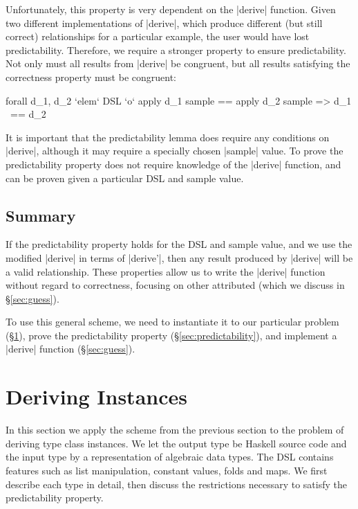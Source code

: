 \documentclass[preprint,draft]{sigplanconf}
\begin{document}
Unfortunately, this property is very dependent on the |derive| function. Given two different implementations of |derive|, which produce different (but still correct) relationships for a particular example, the user would have lost predictability. Therefore, we require a stronger property to ensure predictability. Not only must all results from |derive| be congruent, but all results satisfying the correctness property must be congruent:

\ignore\begin{code}
forall d_1, d_2 `elem` DSL `o`
    apply d_1 sample == apply d_2 sample => d_1 ~== d_2
\end{code}

It is important that the predictability lemma does require any conditions on |derive|, although it may require a specially chosen |sample| value. To prove the predictability property does not require knowledge of the |derive| function, and can be proven given a particular DSL and sample value.

\subsection{Summary}

If the predictability property holds for the DSL and sample value, and we use the modified |derive| in terms of |derive'|, then any result produced by |derive| will be a valid relationship. These properties allow us to write the |derive| function without regard to correctness, focusing on other attributed (which we discuss in \S\ref{sec:guess}).

To use this general scheme, we need to instantiate it to our particular problem (\S\ref{sec:instances}), prove the predictability property (\S\ref{sec:predictability}), and implement a |derive| function (\S\ref{sec:guess}).

\section{Deriving Instances}
\label{sec:instances}

In this section we apply the scheme from the previous section to the problem of deriving type class instances. We let the output type be Haskell source code and the input type by a representation of algebraic data types. The DSL contains features such as list manipulation, constant values, folds and maps. We first describe each type in detail, then discuss the restrictions necessary to satisfy the predictability property.
\end{document}
